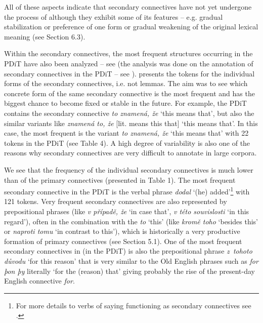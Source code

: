 \documentclass[output=paper]{langsci/langscibook.cls}
\begin{document}
All of these aspects indicate that secondary connectives have not yet undergone the process of  although they exhibit some of its features – e.g. gradual stabilization or preference of one form or gradual weakening of the original lexical meaning (see Section 6.3). 


Within the secondary connectives, the most frequent structures occurring in the PDiT have also been analyzed – see  (the analysis was done on the annotation of secondary connectives in the PDiT – see
\citealt{biblio:RyRyCentreand2014,biblio:RyRySecondaryConnectives2015}).  presents the tokens for the individual forms of the secondary connectives, i.e. not lemmas. The aim was to see which concrete form of the same secondary connective is the most frequent and has the biggest chance to become fixed or stable in the future. For example, the PDiT contains the secondary connective \textit{to znamená, že} `this means that', but also the similar variants like \textit{znamená to, že} [lit. means this that] `this means that'. In this case, the most frequent is the variant \textit{to znamená, že} `this means that' with 22 tokens in the PDiT (see Table 4). A high degree of variability is also one of the reasons why secondary connectives are very difficult to annotate in large corpora.


We see that the frequency of the individual secondary connectives is much lower than of the primary connectives (presented in Table 1). The most frequent secondary connective in the PDiT is the verbal phrase \textit{dodal} `(he) added'\footnote{ For more details to verbs of saying functioning as secondary connectives see \citet{rysova2014verbs}.} with 121 tokens. Very frequent secondary connectives are also represented by prepositional phrases (like \textit{v případě, že} `in case that', \textit{v této souvislosti} `in this regard'), often in the combination with the \textit{ to} `this' (like \textit{kromě toho} `besides this' or \textit{naproti tomu }`in contrast to this'), which is historically a very productive formation of primary connectives (see Section 5.1). 
One of the most frequent secondary connectives in  (in the PDiT) is also the prepositional phrase \textit{z~tohoto důvodu} `for this reason' that is very similar to the Old English phrases such as \textit{for þon þy} literally `for the (reason) that' giving probably the rise of the present-day English connective \textit{for}. 
\end{document}

